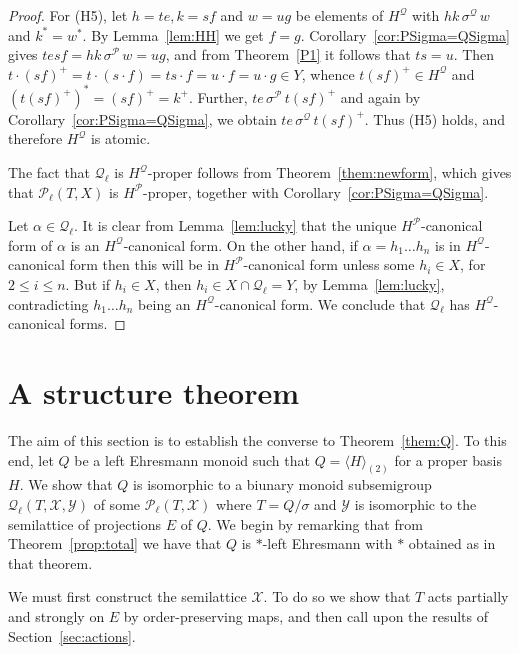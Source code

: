 \documentclass[12pt]{amsart}
\theoremstyle{definition}
\theoremstyle{definition}
\numberwithin{them}{section}
\numberwithin{equation}{section}
\newcommand{\QQ}{\mbox{$\mathcal{Q}_\ell$}}
\newcommand{\X}{\mathcal{X}}
\newcommand{\Y}{\mathcal{Y}}
\begin{document}
{{\begin{proof}
For (H5), let $h=te, k=sf$ and $w=ug$ be elements of $H^{\mathcal{Q}}$ with $hk\,\sigma^{\mathcal{Q}}\, w$ and $k^*=w^*$.  By Lemma~\ref{lem:HH} we get $f=g$.  Corollary~\ref{cor:PSigma=QSigma} gives  $tesf=hk\,\sigma^{\mathcal{P}}\, w=ug$, and from Theorem~\ref{P1} it follows that  $ts=u$. Then 
$t\cdot (sf)^+=t\cdot (s\cdot f)= ts\cdot f=u\cdot f =u\cdot g\in Y$, whence  
$t(sf)^+\in H^{\mathcal{Q}}$ 
and $(t(sf)^+)^*=(sf)^+=k^+$. Further,
$te\, \sigma^{\mathcal{P}}\, t(sf)^+$ and again by Corollary~\ref{cor:PSigma=QSigma}, we obtain 
$te\, \sigma^{\mathcal{Q}}\, t(sf)^+$.  Thus  (H5) holds, and therefore $H^{\mathcal{Q}}$ is  atomic. 

The fact that $\QQ$ is $H^{\mathcal{Q}}$-proper follows from Theorem~\ref{them:newform}, which gives that $\mathcal{P}_{\ell}(T,X)$ is  $H^{\mathcal{P}}$-proper, together with Corollary~\ref{cor:PSigma=QSigma}. 

Let $\alpha\in \QQ$. It is clear 
from Lemma~\ref{lem:lucky}  that the unique $H^{\mathcal{P}}$-canonical form of  $\alpha$ is an $H^{\mathcal{Q}}$-canonical form. On the other hand, if $\alpha=h_1\dots h_n$ is in $H^{\mathcal{Q}}$-canonical form then this will be in $H^{\mathcal{P}}$-canonical form unless some $h_i\in X$, for $2\leq i\leq n$. But if $h_i\in X$, then $h_i\in X\cap \QQ=Y$, by Lemma~\ref{lem:lucky}, contradicting $h_1\dots h_n$ being an $H^{\mathcal{Q}}$-canonical form. We conclude  that $\QQ$ has   $H^{\mathcal{Q}}$-canonical forms. \end{proof}


\section{A structure theorem }\label{sec:structtheorem}

The aim of this section is to establish the converse to Theorem~\ref{them:Q}.  To this end, let $Q$
be a left Ehresmann monoid  such that $Q=\langle H\rangle_{(2)}$ for a proper basis $H$.  We show that $Q$ is isomorphic to  a  biunary monoid subsemigroup  $\QQ(T,\X,\Y)$ of some $\mathcal{P}_{\ell}(T,\X)$ where $T = Q/\sigma$ and $\Y$ is isomorphic to  the semilattice of projections $E$ of $Q$. We begin by remarking that from Theorem~\ref{prop:total}  we have that $Q$ is $*$-left Ehresmann with $*$ obtained as in that theorem.

We must first construct the semilattice $\mathcal{X}$.  To do so we show that $T$ acts partially and strongly on $E$ by order-preserving maps, and then call upon the results of Section~\ref{sec:actions}. 

}}
\end{document}
